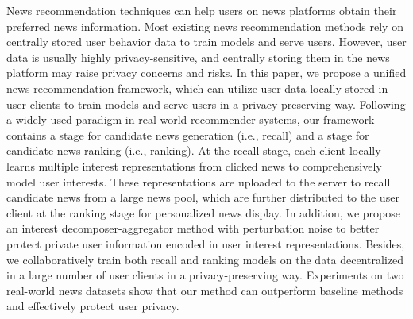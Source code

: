 News recommendation techniques can help users on news platforms obtain their preferred news information. Most existing news recommendation methods rely on centrally stored user behavior data to train models and serve users. However, user data is usually highly privacy-sensitive, and centrally storing them in the news platform may raise privacy concerns and risks. In this paper, we propose a unified news recommendation framework, which can utilize user data locally stored in user clients to train models and serve users in a privacy-preserving way. Following a widely used paradigm in real-world recommender systems, our framework contains a stage for candidate news generation (i.e., recall) and a stage for candidate news ranking (i.e., ranking). At the recall stage, each client locally learns multiple interest representations from clicked news to comprehensively model user interests. These representations are uploaded to the server to recall candidate news from a large news pool, which are further distributed to the user client at the ranking stage for personalized news display. In addition, we propose an interest decomposer-aggregator method with perturbation noise to better protect private user information encoded in user interest representations. Besides, we collaboratively train both recall and ranking models on the data decentralized in a large number of user clients in a privacy-preserving way. Experiments on two real-world news datasets show that our method can outperform baseline methods and effectively protect user privacy.

